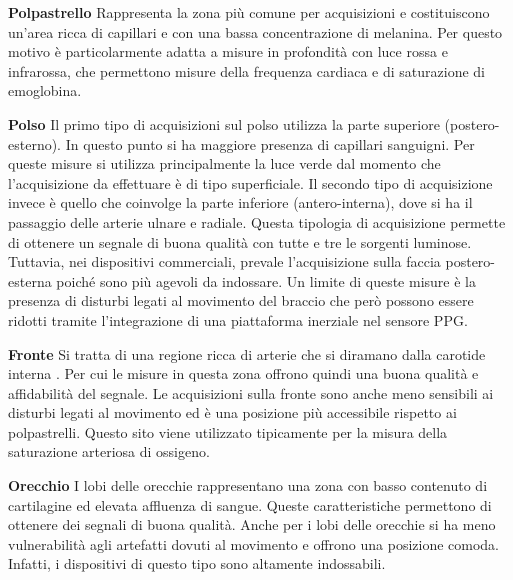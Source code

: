 \textbf{Polpastrello} Rappresenta la zona più comune per acquisizioni e costituiscono un'area ricca di capillari e con una bassa concentrazione di melanina. Per questo motivo è particolarmente adatta a misure in profondità con luce rossa e infrarossa, che permettono misure della frequenza cardiaca e di saturazione di emoglobina.

\textbf{Polso}  Il primo tipo di acquisizioni sul polso utilizza la parte superiore (postero-esterno). In questo punto si ha maggiore presenza di capillari sanguigni. Per queste misure si utilizza principalmente la luce verde dal momento che l'acquisizione da effettuare è di tipo superficiale.	 Il secondo tipo di acquisizione invece è quello che coinvolge la parte inferiore (antero-interna), dove si ha il passaggio delle arterie ulnare e radiale. Questa tipologia di acquisizione permette di ottenere un segnale di buona qualità con tutte e tre le sorgenti luminose. Tuttavia, nei dispositivi commerciali, prevale l'acquisizione sulla faccia postero-esterna poiché sono più agevoli da indossare. Un limite di queste misure è la presenza di disturbi legati al movimento del braccio che però possono essere ridotti tramite l'integrazione di una piattaforma inerziale nel sensore PPG\cite{Ghamari2018}.

\textbf{Fronte} Si tratta di una regione ricca di arterie che si diramano dalla carotide interna \cite{Abay2019}. Per cui le misure in questa zona offrono quindi una buona qualità e affidabilità del segnale. Le acquisizioni sulla fronte sono anche meno sensibili ai disturbi legati al movimento ed è una posizione più accessibile rispetto ai polpastrelli. Questo sito viene utilizzato tipicamente per la misura della saturazione arteriosa di ossigeno.

\textbf{Orecchio} I lobi delle orecchie rappresentano una zona con basso contenuto di cartilagine ed elevata affluenza di sangue. Queste caratteristiche permettono di ottenere dei segnali di buona qualità. Anche per i lobi delle orecchie si ha meno vulnerabilità agli artefatti dovuti al movimento e offrono una posizione comoda. Infatti, i dispositivi di questo tipo sono altamente indossabili\cite{Ghamari2018}.

 